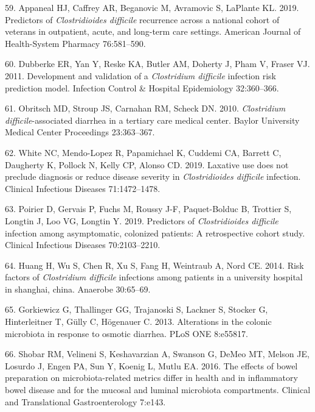\documentclass[
  11pt,
]{article}
\begin{document}
\leavevmode\hypertarget{ref-Appaneal2019}{}%
59. Appaneal HJ, Caffrey AR, Beganovic M, Avramovic S, LaPlante KL.
2019. Predictors of \emph{Clostridioides difficile} recurrence across a
national cohort of veterans in outpatient, acute, and long-term care
settings. American Journal of Health-System Pharmacy 76:581--590.

\leavevmode\hypertarget{ref-Dubberke2011}{}%
60. Dubberke ER, Yan Y, Reske KA, Butler AM, Doherty J, Pham V, Fraser
VJ. 2011. Development and validation of a \emph{Clostridium difficile}
infection risk prediction model. Infection Control \& Hospital
Epidemiology 32:360--366.

\leavevmode\hypertarget{ref-Obritsch2010}{}%
61. Obritsch MD, Stroup JS, Carnahan RM, Scheck DN. 2010.
\emph{Clostridium difficile}-associated diarrhea in a tertiary care
medical center. Baylor University Medical Center Proceedings
23:363--367.

\leavevmode\hypertarget{ref-White2019}{}%
62. White NC, Mendo-Lopez R, Papamichael K, Cuddemi CA, Barrett C,
Daugherty K, Pollock N, Kelly CP, Alonso CD. 2019. Laxative use does not
preclude diagnosis or reduce disease severity in \emph{Clostridioides
difficile} infection. Clinical Infectious Diseases 71:1472--1478.

\leavevmode\hypertarget{ref-Poirier2019}{}%
63. Poirier D, Gervais P, Fuchs M, Roussy J-F, Paquet-Bolduc B, Trottier
S, Longtin J, Loo VG, Longtin Y. 2019. Predictors of
\emph{Clostridioides difficile} infection among asymptomatic, colonized
patients: A retrospective cohort study. Clinical Infectious Diseases
70:2103--2210.

\leavevmode\hypertarget{ref-Huang2014}{}%
64. Huang H, Wu S, Chen R, Xu S, Fang H, Weintraub A, Nord CE. 2014.
Risk factors of \emph{Clostridium difficile} infections among patients
in a university hospital in shanghai, china. Anaerobe 30:65--69.

\leavevmode\hypertarget{ref-Gorkiewicz2013}{}%
65. Gorkiewicz G, Thallinger GG, Trajanoski S, Lackner S, Stocker G,
Hinterleitner T, Gülly C, Högenauer C. 2013. Alterations in the colonic
microbiota in response to osmotic diarrhea. PLoS ONE 8:e55817.

\leavevmode\hypertarget{ref-Shobar2016}{}%
66. Shobar RM, Velineni S, Keshavarzian A, Swanson G, DeMeo MT, Melson
JE, Losurdo J, Engen PA, Sun Y, Koenig L, Mutlu EA. 2016. The effects of
bowel preparation on microbiota-related metrics differ in health and in
inflammatory bowel disease and for the mucosal and luminal microbiota
compartments. Clinical and Translational Gastroenterology 7:e143.
\end{document}
